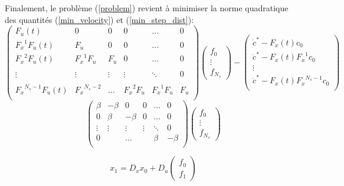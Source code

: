\documentclass[10pt,a4paper]{article}
\begin{document}
Finalement, le problème (\ref{problem}) revient à minimiser la norme quadratique des quantités (\ref{min_velocity}) et (\ref{min_step_dist}):
\begin{equation}\label{min_velocity}
\begin{pmatrix} 
 F_u(t)        		& 0 	 		& 0 &0& \hdots & 0 \\
 {F_x}^1 F_u(t) 		& F_u 	 		& 0 &0& \hdots & 0 \\
 {F_x}^2 F_u(t) 		& {F_x}^1 F_u 	& F_u &0& \hdots & 0 \\ \\
 \vdots	 			&\vdots 	& \vdots & \vdots &  \ddots & 0 \\ \\
 {F_x}^{N_s-1} F_u(t) 	&  {F_x}^{N_s-2}	& \hdots& {F_x}^2 F_u& {F_x}^1 F_u  & F_u \\
\end{pmatrix}\begin{pmatrix} 
f_0 \\
\vdots \\
f_{N_s}
\end{pmatrix} - \begin{pmatrix} 
\dot{c}^*-F_x(t) c_0\\
\dot{c}^*-F_x(t){F_x}^1 c_0\\
\vdots \\
\dot{c}^*-F_x(t){F_x}^{N_s-1} c_0\\
\end{pmatrix}
\end{equation}
\begin{equation}\label{min_step_dist}
\begin{pmatrix} 
 \beta    & -\beta 	 	& 0 &0& \hdots & 0 \\
 0&\beta    & -\beta 	 	& 0 & \hdots & 0 \\
 \vdots	 			&\vdots 	& \vdots & \vdots &  \ddots & 0 \\ 
 0       		&  	 		&    \hdots&  & \beta    & -\beta \\
\end{pmatrix}
\begin{pmatrix} 
f_0 \\
\vdots \\
f_{N_s}
\end{pmatrix}
\end{equation}


\begin{equation}
x_1=D_xx_0+D_u\begin{pmatrix} f_0 \\ f_1 \end{pmatrix}
\end{equation}
\end{document}
